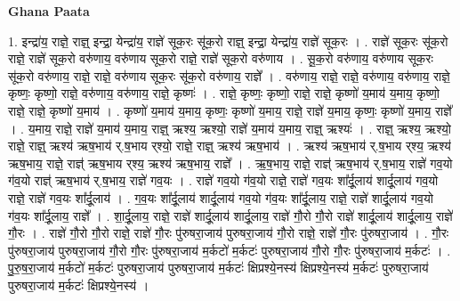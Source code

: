 \documentclass[17pt]{extarticle}
\begin{document}
\textbf{Ghana Paata } \newline

1. इन्द्रा॑य॒ राज्ञे॒ राज्ञ्॒ इन्द्रा॒ येन्द्रा॑य॒ राज्ञे॑ सूक॒रः सू॑क॒रो राज्ञ्॒ इन्द्रा॒ येन्द्रा॑य॒ राज्ञे॑ सूक॒रः । . राज्ञे॑ सूक॒रः सू॑क॒रो राज्ञे॒ राज्ञे॑ सूक॒रो वरु॑णाय॒ वरु॑णाय सूक॒रो राज्ञे॒ राज्ञे॑ सूक॒रो वरु॑णाय । . सू॒क॒रो वरु॑णाय॒ वरु॑णाय सूक॒रः सू॑क॒रो वरु॑णाय॒ राज्ञे॒ राज्ञे॒ वरु॑णाय सूक॒रः सू॑क॒रो वरु॑णाय॒ राज्ञे᳚ । . वरु॑णाय॒ राज्ञे॒ राज्ञे॒ वरु॑णाय॒ वरु॑णाय॒ राज्ञे॒ कृष्णः॒ कृष्णो॒ राज्ञे॒ वरु॑णाय॒ वरु॑णाय॒ राज्ञे॒ कृष्णः॑ । . राज्ञे॒ कृष्णः॒ कृष्णो॒ राज्ञे॒ राज्ञे॒ कृष्णो॑ य॒माय॑ य॒माय॒ कृष्णो॒ राज्ञे॒ राज्ञे॒ कृष्णो॑ य॒माय॑ । . कृष्णो॑ य॒माय॑ य॒माय॒ कृष्णः॒ कृष्णो॑ य॒माय॒ राज्ञे॒ राज्ञे॑ य॒माय॒ कृष्णः॒ कृष्णो॑ य॒माय॒ राज्ञे᳚ । . य॒माय॒ राज्ञे॒ राज्ञे॑ य॒माय॑ य॒माय॒ राज्ञ्॒ ऋश्य॒ ऋश्यो॒ राज्ञे॑ य॒माय॑ य॒माय॒ राज्ञ्॒ ऋश्यः॑ । . राज्ञ्॒ ऋश्य॒ ऋश्यो॒ राज्ञे॒ राज्ञ्॒ ऋश्य॑ ऋष॒भाय॑ र्.ष॒भाय र्‌श्यो॒ राज्ञे॒ राज्ञ्॒ ऋश्य॑ ऋष॒भाय॑ । . ऋश्य॑ ऋष॒भाय॑ र्.ष॒भाय र्‌श्य॒ ऋश्य॑ ऋष॒भाय॒ राज्ञे॒ राज्ञ्॑ ऋष॒भाय र्‌श्य॒ ऋश्य॑ ऋष॒भाय॒ राज्ञे᳚ । . ऋ॒ष॒भाय॒ राज्ञे॒ राज्ञ्॑ ऋष॒भाय॑ र्.ष॒भाय॒ राज्ञे॑ गव॒यो ग॑व॒यो राज्ञ्॑ ऋष॒भाय॑ र्.ष॒भाय॒ राज्ञे॑ गव॒यः । . राज्ञे॑ गव॒यो ग॑व॒यो राज्ञे॒ राज्ञे॑ गव॒यः शा᳚र्दू॒लाय॑ शार्दू॒लाय॑ गव॒यो राज्ञे॒ राज्ञे॑ गव॒यः शा᳚र्दू॒लाय॑ । . ग॒व॒यः शा᳚र्दू॒लाय॑ शार्दू॒लाय॑ गव॒यो ग॑व॒यः शा᳚र्दू॒लाय॒ राज्ञे॒ राज्ञे॑ शार्दू॒लाय॑ गव॒यो ग॑व॒यः शा᳚र्दू॒लाय॒ राज्ञे᳚ । . शा॒र्दू॒लाय॒ राज्ञे॒ राज्ञे॑ शार्दू॒लाय॑ शार्दू॒लाय॒ राज्ञे॑ गौ॒रो गौ॒रो राज्ञे॑ शार्दू॒लाय॑ शार्दू॒लाय॒ राज्ञे॑ गौ॒रः । . राज्ञे॑ गौ॒रो गौ॒रो राज्ञे॒ राज्ञे॑ गौ॒रः पु॑रुषरा॒जाय॑ पुरुषरा॒जाय॑ गौ॒रो राज्ञे॒ राज्ञे॑ गौ॒रः पु॑रुषरा॒जाय॑ । . गौ॒रः पु॑रुषरा॒जाय॑ पुरुषरा॒जाय॑ गौ॒रो गौ॒रः पु॑रुषरा॒जाय॑ म॒र्कटो॑ म॒र्कटः॑ पुरुषरा॒जाय॑ गौ॒रो गौ॒रः पु॑रुषरा॒जाय॑ म॒र्कटः॑ । . पु॒रु॒ष॒रा॒जाय॑ म॒र्कटो॑ म॒र्कटः॑ पुरुषरा॒जाय॑ पुरुषरा॒जाय॑ म॒र्कटः॑ क्षिप्रश्ये॒नस्य॑ क्षिप्रश्ये॒नस्य॑ म॒र्कटः॑ पुरुषरा॒जाय॑ पुरुषरा॒जाय॑ म॒र्कटः॑ क्षिप्रश्ये॒नस्य॑ । \newline
\end{document}
